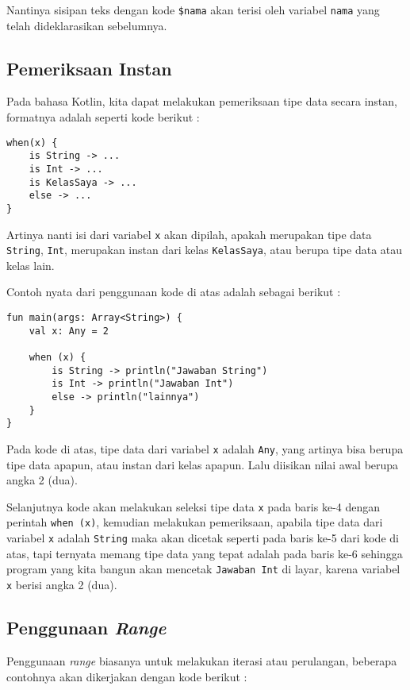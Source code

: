 Nantinya sisipan teks dengan kode \texttt{\$nama} akan terisi oleh variabel \texttt{nama} yang telah dideklarasikan sebelumnya.

\subsection{Pemeriksaan Instan}

Pada bahasa Kotlin, kita dapat melakukan pemeriksaan tipe data secara instan, formatnya adalah seperti kode berikut :

\begin{lstlisting}
when(x) {
	is String -> ...
	is Int -> ...
	is KelasSaya -> ...
	else -> ...
}
\end{lstlisting}

Artinya nanti isi dari variabel \texttt{x} akan dipilah, apakah merupakan tipe data \texttt{String}, \texttt{Int}, merupakan instan dari kelas \texttt{KelasSaya}, atau berupa tipe data atau kelas lain.

Contoh nyata dari penggunaan kode di atas adalah sebagai berikut :

\begin{lstlisting}
fun main(args: Array<String>) {
	val x: Any = 2
	
	when (x) {
		is String -> println("Jawaban String")
		is Int -> println("Jawaban Int")
		else -> println("lainnya")
	}
}
\end{lstlisting}

Pada kode di atas, tipe data dari variabel \texttt{x} adalah \texttt{Any}, yang artinya bisa berupa tipe data apapun, atau instan dari kelas apapun. Lalu diisikan nilai awal berupa angka 2 (dua).

Selanjutnya kode akan melakukan seleksi tipe data \texttt{x} pada baris ke-4 dengan perintah \texttt{when (x)}, kemudian melakukan pemeriksaan, apabila tipe data dari variabel \texttt{x} adalah \texttt{String} maka akan dicetak seperti pada baris ke-5 dari kode di atas, tapi ternyata memang tipe data yang tepat adalah pada baris ke-6 sehingga program yang kita bangun akan mencetak \texttt{Jawaban Int} di layar, karena variabel \texttt{x} berisi angka 2 (dua).

\subsection{Penggunaan \textit{Range}}

Penggunaan \textit{range} biasanya untuk melakukan iterasi atau perulangan, beberapa contohnya akan dikerjakan dengan kode berikut :


